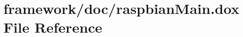 \hypertarget{raspbian_main_8dox}{}\section{framework/doc/raspbian\+Main.dox File Reference}
\label{raspbian_main_8dox}
